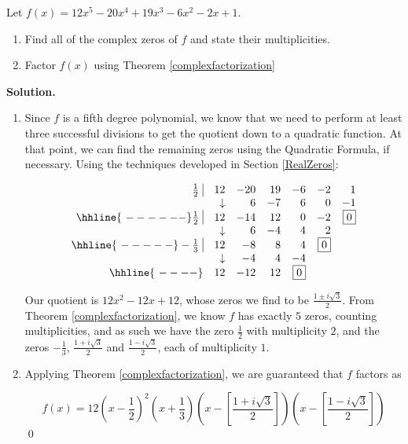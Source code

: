 \begin{ex}  Let $f(x) = 12x^5 - 20x^4+19x^3-6x^2-2x+1$.

\begin{enumerate}

\item Find all of the complex zeros of $f$ and state their multiplicities.  

\item  Factor $f(x)$ using Theorem \ref{complexfactorization}

\end{enumerate}

{ \bf Solution.}

\begin{enumerate}

\item  Since $f$ is a fifth degree polynomial, we know that we need to perform at least three successful divisions to get the quotient down to a quadratic function.  At that point, we can find the remaining zeros using the Quadratic Formula, if necessary.  Using the techniques developed in Section \ref{RealZeros}:

\[\begin{array}{rrrrrrr}
\frac{1}{2} \, \, \vline& 12 & -20& 19  & -6 & -2 &1 \\

  & \downarrow     &  6  &  -7  & 6 & 0 & -1\\ \hhline{~------} 

 \frac{1}{2} \, \, \vline& 12 & -14 & 12  & 0 & -2 & \fbox{$0$} \\

  & \downarrow     &  6 &  -4  & 4 & 2 &\\ \hhline{~-----} 
  
  -\frac{1}{3} \, \, \vline&  12 &  -8  & 8 & 4 &  \fbox{$0$} & \\
    
               & \downarrow &  -4  &  4  & -4  & & \\ \hhline{~----} 
 
   & 12  &   -12 & 12& \fbox{0} &&   \\
  
\end{array}\]

Our quotient is $12x^2 - 12x + 12$, whose zeros we find to be $\frac{1 \pm i \sqrt{3}}{2}$.  From Theorem \ref{complexfactorization}, we know $f$ has exactly $5$ zeros, counting multiplicities, and as such we have the zero $\frac{1}{2}$ with multiplicity $2$, and the zeros $-\frac{1}{3}$, $\frac{1 + i \sqrt{3}}{2}$ and $\frac{1 - i \sqrt{3}}{2}$, each of multiplicity $1$.

\item  Applying Theorem \ref{complexfactorization}, we are guaranteed that $f$ factors as

\[f(x) = 12 \left(x- \dfrac{1}{2}\right)^2 \left(x + \dfrac{1}{3}\right) \left(x - \left[\dfrac{1 + i \sqrt{3}}{2}\right]\right) \left(x - \left[\dfrac{1 - i \sqrt{3}}{2}\right]\right)\]
\qed

\end{enumerate}

\end{ex}

